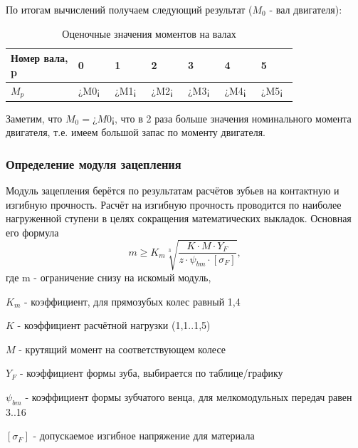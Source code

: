 \documentclass[14pt,a4paper,russian]{scrartcl}
\begin{document}
        По итогам вычислений получаем следующий результат (\( M_0 \) - вал двигателя):
        \begin{table}[h!]
            \begin{center}
                \begin{tabular}{p{0.2\linewidth}p{0.1\linewidth}p{0.1\linewidth}p{0.1\linewidth}p{0.1\linewidth}p{0.1\linewidth}p{0.1\linewidth}}
                    \hline
                    Номер вала, p & 0 & 1 & 2 & 3 & 4 & 5 \\
                    \hline
                    \( M_p \) & ¿M0¡ & ¿M1¡ & ¿M2¡ & ¿M3¡ & ¿M4¡ & ¿M5¡ \\
                    \hline
                \end{tabular}
                \caption{Оценочные значения моментов на валах}\label{tab:moments__shaft_estimate}
            \end{center}
        \end{table}

        Заметим, что \( M_0=¿M0¡ \), что в 2 раза больше значения номинального момента двигателя,
        т.е. имеем большой запас по моменту двигателя.

    \subsubsection{Определение модуля зацепления}
        Модуль зацепления берётся по результатам расчётов зубьев на контактную и
        изгибную прочность. Расчёт на изгибную прочность проводится по наиболее нагруженной ступени в целях
        сокращения математических выкладок. Основная его формула
        \[ m \geq K_m\sqrt[3]{\frac{K\cdot M\cdot Y_F}{z\cdot\psi_{bm}\cdot[\sigma_F]}}, \]
        где m - ограничение снизу на искомый модуль,\par
            \( K_m \) - коэффициент, для прямозубых колес равный 1,4\par 
            \( K \) - коэффициент расчётной нагрузки (1,1..1,5)\par
            \( M \) - крутящий момент на соответствующем колесе\par
            \( Y_F \) - коэффициент формы зуба, выбирается по таблице/графику\par
            \( \psi_{bm} \) - коэффициент формы зубчатого венца, для мелкомодульных передач равен 3..16\par
            \( [\sigma_F] \) - допускаемое изгибное напряжение для материала\par
        
\end{document}
